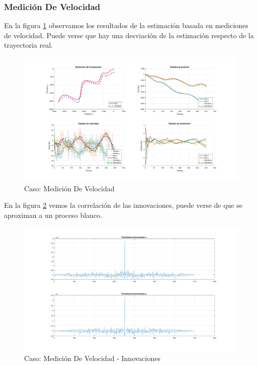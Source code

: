 		\subsubsection{Medición De Velocidad}
		
		En la figura \ref{fig:ej2b} observamos los resultados de la estimación basada en mediciones de velocidad. Puede verse que hay una desviación de la estimación respecto de la trayectoria real.
		
		\begin{figure}[H]
			\centering
			\includegraphics[width=1.0\textwidth,keepaspectratio]{Figuras/graf_ej2b.pdf}
			\caption{Caso: Medición De Velocidad}
			\label{fig:ej2b}
		\end{figure}
		
		En la figura \ref{fig:ej2b_innov} vemos la correlación de las innovaciones, puede verse de que se aproximan a un proceso blanco.
		
		\begin{figure}[H]
			\centering
			\includegraphics[width=1.0\textwidth,keepaspectratio]{Figuras/covinn_ej2b.pdf}
			\caption{Caso: Medición De Velocidad - Innovaciones}
			\label{fig:ej2b_innov}
		\end{figure}
			
